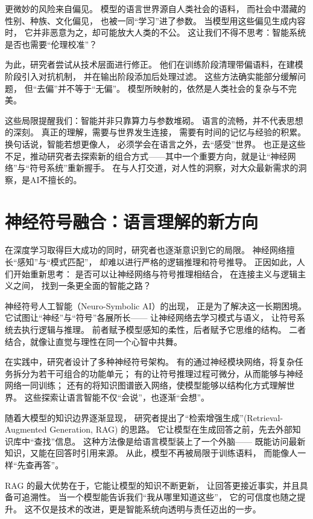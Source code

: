 更微妙的风险来自偏见。  
模型的语言世界源自人类社会的语料，  
而社会中潜藏的性别、种族、文化偏见，  
也被一同“学习”进了参数。  
当模型用这些偏见生成内容时，  
它并非恶意为之，却可能放大人类的不公。  
这让我们不得不思考：智能系统是否也需要“伦理校准”？  

为此，研究者尝试从技术层面进行修正。  
他们在训练阶段清理带偏语料，在建模阶段引入对抗机制，  
并在输出阶段添加后处理过滤。  
这些方法确实能部分缓解问题，  
但“去偏”并不等于“无偏”。  
模型所映射的，依然是人类社会的复杂与不完美。  

这些局限提醒我们：智能并非只靠算力与参数堆砌。  
语言的流畅，并不代表思想的深刻。  
真正的理解，需要与世界发生连接，  
需要有时间的记忆与经验的积累。  
换句话说，智能若想更像人，  
必须学会在语言之外，去“感受”世界。 
也正是这些不足，推动研究者去探索新的组合方式——其中一个重要方向，就是让“神经网络”与“符号系统”重新握手。
在与人打交道，对人性的洞察，对大众最新需求的洞察，是AI不擅长的。 
 

\section{神经符号融合：语言理解的新方向}

在深度学习取得巨大成功的同时，研究者也逐渐意识到它的局限。  
神经网络擅长“感知”与“模式匹配”，  
却难以进行严格的逻辑推理和符号推导。  
正因如此，人们开始重新思考：  
是否可以让神经网络与符号推理相结合，  
在连接主义与逻辑主义之间，  
找到一条更全面的智能之路？  

神经符号人工智能（Neuro-Symbolic AI）的出现，  
正是为了解决这一长期困境。  
它试图让“神经”与“符号”各展所长——  
让神经网络去学习模式与语义，  
让符号系统去执行逻辑与推理。  
前者赋予模型感知的柔性，后者赋予它思维的结构。  
二者结合，就像让直觉与理性在同一个心智中共舞。  

在实践中，研究者设计了多种神经符号架构。  
有的通过神经模块网络，将复杂任务拆分为若干可组合的功能单元；  
有的让符号推理过程可微分，从而能够与神经网络一同训练；  
还有的将知识图谱嵌入网络，使模型能够以结构化方式理解世界。  
这些探索让语言智能不仅“会说”，也逐渐“会想”。  

随着大模型的知识边界逐渐显现，  
研究者提出了“检索增强生成”(Retrieval-Augmented Generation, RAG) 的思路。  
它让模型在生成回答之前，先去外部知识库中“查找”信息。  
这种方法像是给语言模型装上了一个外脑——  
既能访问最新知识，又能在回答时引用来源。  
从此，模型不再被局限于训练语料，  
而能像人一样“先查再答”。  

RAG 的最大优势在于，它能让模型的知识不断更新，  
让回答更接近事实，并且具备可追溯性。  
当一个模型能告诉我们“我从哪里知道这些”，  
它的可信度也随之提升。  
这不仅是技术的改进，更是智能系统向透明与责任迈出的一步。  

